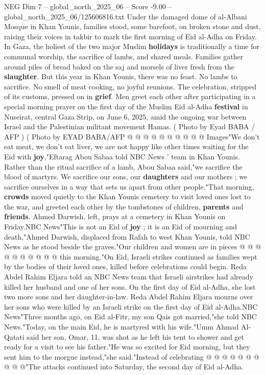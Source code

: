 \begin{textsample}{NEG Dim 7 – global\_north\_2025\_06 – Score -9.00 – global\_north\_2025\_06/125606816.txt}  \label{ex:f7_neg_075}
Under the damaged dome of al-Albani Mosque in Khan Younis, families stood, some barefoot, on broken stone and dust, raising their voices in takbir to mark the first morning of Eid al-Adha on Friday.
In Gaza, the holiest of the two major Muslim \textbf{holidays} is traditionally a time for communal worship, the sacrifice of lambs, and shared meals.
Families gather around piles of bread baked on the saj and morsels of liver fresh from the \textbf{slaughter}.
But this year in Khan Younis, there was no feast.
No lambs to sacrifice.
No smell of meat cooking, no joyful reunions.
The celebration, stripped of its customs, pressed on in \textbf{grief}.
Men greet each other after participating in a special morning prayer on the first day of the Muslim Eid al-Adha \textbf{festival} in Nuseirat, central Gaza Strip, on June 6, 2025, amid the ongoing war between Israel and the Palestinian militant movement Hamas. ( Photo by Eyad BABA / AFP ) ( Photo by EYAD BABA/AFP @ @ @ @ @ @ @ @ @ @ Images"We don't eat meat, we don't eat liver, we are not happy like other times waiting for the Eid with \textbf{joy},"Eftarag Abou Sabaa told NBC News ' team in Khan Younis.
Rather than the ritual sacrifice of a lamb, Abou Sabaa said,"we sacrifice the blood of martyrs.
We sacrifice our sons, our \textbf{daughters} and our mothers ; we sacrifice ourselves in a way that sets us apart from other people."That morning, \textbf{crowds} moved quietly to the Khan Younis cemetery to visit loved ones lost to the war, and greeted each other by the tombstones of children, \textbf{parents} and \textbf{friends}.
Ahmed Darwish, left, prays at a cemetery in Khan Younis on Friday.NBC News"This is not an Eid of \textbf{joy} ; it is an Eid of mourning and death,"Ahmed Darwish, displaced from Rafah to west Khan Younis, told NBC News as he stood beside the graves."Our children and women are in pieces @ @ @ @ @ @ @ @ @ @ this morning."On Eid, Israeli strikes continued as families wept by the bodies of their loved ones, killed before celebrations could begin.
Reda Abdel Rahim Eljara told an NBC News team that Israeli airstrikes had already killed her husband and one of her sons.
On the first day of Eid al-Adha, she lost two more sons and her daughter-in-law.
Reda Abdel Rahim Eljara mourns over her sons who were killed by an Israeli strike on the first day of Eid al-Adha.NBC News"Three months ago, on Eid al-Fitr, my son Qais got married,"she told NBC News."Today, on the main Eid, he is martyred with his wife."Umm Ahmad Al-Qatati said her son, Omar, 11, was shot as he left his tent to shower and get ready for a visit to see his father."He was so excited for Eid morning, but they sent him to the morgue instead,"she said."Instead of celebrating @ @ @ @ @ @ @ @ @ @"The attacks continued into Saturday, the second day of Eid al-Adha.

\end{textsample}
